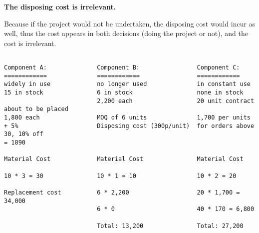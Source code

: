 \documentclass{article}
\begin{document}
\textbf{The disposing cost is irrelevant.}

Because if the project would not be undertaken, the disposing cost would incur as well, thus the cost appears in both decisions (doing the project or not), and the cost is irrelevant.

\clearpage

\begin{verbatim}

Component A:              Component B:                Component C:
============              ============                ============
widely in use             no longer used              in constant use
15 in stock               6 in stock                  none in stock
                          2,200 each                  20 unit contract about to be placed
1,800 each                MOQ of 6 units              1,700 per units 
+ 5%                      Disposing cost (300p/unit)  for orders above 30, 10% off
= 1890                    

Material Cost             Material Cost               Material Cost

10 * 3 = 30               10 * 1 = 10                 10 * 2 = 20
                                                      
Replacement cost          6 * 2,200                   20 * 1,700 = 34,000
                          6 * 0                       40 * 170 = 6,800
                                                         
                          Total: 13,200               Total: 27,200
                          
\end{verbatim}
\end{document}
